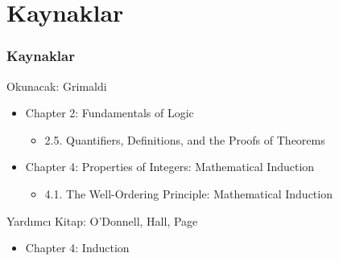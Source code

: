 \documentclass[dvipsnames]{beamer}
\theoremstyle{definition}
\theoremstyle{example}
\theoremstyle{plain}
\begin{document}
\section*{Kaynaklar}

\begin{frame}
  \frametitle{Kaynaklar}

  \begin{block}{Okunacak: Grimaldi}
    \begin{itemize}
      \item Chapter 2: Fundamentals of Logic
      \begin{itemize}
        \item 2.5. \alert{Quantifiers, Definitions, and the Proofs of Theorems}
      \end{itemize}

      \item Chapter 4: Properties of Integers: Mathematical Induction
      \begin{itemize}
        \item 4.1. \alert{The Well-Ordering Principle: Mathematical Induction}
      \end{itemize}
    \end{itemize}
  \end{block}

  \begin{block}{Yardımcı Kitap: O'Donnell, Hall, Page}
    \begin{itemize}
      \item Chapter 4: Induction
    \end{itemize}
  \end{block}
\end{frame}
\end{document}
